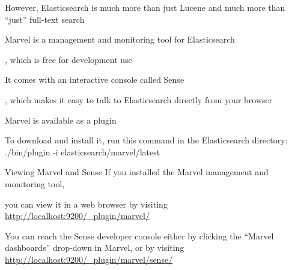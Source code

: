 
However, Elasticsearch is much more than just Lucene and much more than “just” full-text search

Marvel is a management and monitoring tool for Elasticsearch

, which is free for development use

It comes with an interactive console called Sense

, which makes it easy to talk to Elasticsearch directly from your browser

Marvel is available as a plugin

To download and install it, run this command in the Elasticsearch directory: ./bin/plugin -i elasticsearch/marvel/latest 

Viewing Marvel and Sense If you installed the Marvel management and monitoring tool, 

you can view it in a web browser by visiting \url{http://localhost:9200/_plugin/marvel/}

You can reach the Sense developer console either by clicking the “Marvel dashboards” drop-down in Marvel, or by visiting \url{http://localhost:9200/_plugin/marvel/sense/}
